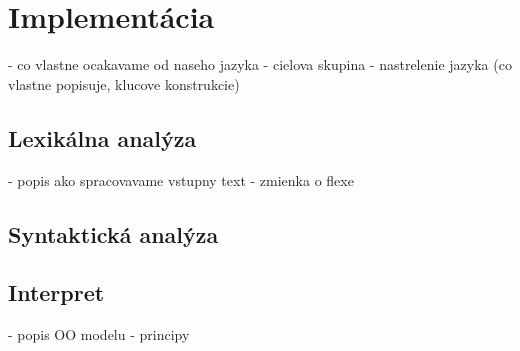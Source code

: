
\chapter{Implementácia}

	- co vlastne ocakavame od naseho jazyka
	- cielova skupina
	- nastrelenie jazyka (co vlastne popisuje, klucove konstrukcie)
\section{Lexikálna analýza}
		- popis ako spracovavame vstupny text
		- zmienka o flexe	
\section{Syntaktická analýza}
\section{Interpret}
		- popis OO modelu
		- principy
	

